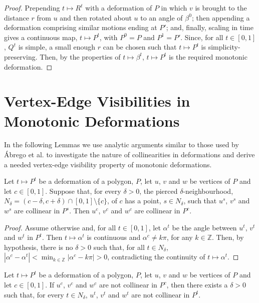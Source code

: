 \documentclass{patmorin}
\newcommand{\Z}[0]{\mathds{Z}}
\begin{document}
\begin{proof}
  Prepending $t\mapsto R^t$ with a deformation of $P$ in which $v$ is
  brought to the distance $r$ from $u$ and then rotated about $u$ to
  an angle of $\beta^0$; then appending a deformation comprising
  similar motions ending at $P'$; and, finally, scaling in time gives
  a continuous map, $t\mapsto P^t$, with $P^0 = P$ and $P^1 = P'$.
  Since, for all $t\in[0,1]$, $Q^t$ is simple, a small enough $r$ can
  be chosen such that $t\mapsto P^t$ is simplicity-preserving.  Then,
  by the properties of $t\mapsto \beta^t$, $t\mapsto P^t$ is the
  required monotonic deformation.
\end{proof}


\iffullversion

\section{Vertex-Edge Visibilities in Monotonic Deformations}

In the following Lemmas we use analytic arguments similar to those
used by {\'A}brego et al. \cite{Abrego11} to investigate the nature of
collinearities in deformations and derive a needed vertex-edge
visibility property of monotonic deformations.

\begin{lemma}
  Let $t\mapsto P^t$ be a deformation of a polygon, $P$, let $u$, $v$
  and $w$ be vertices of $P$ and let $c\in[0,1]$.  Suppose that, for
  every $\delta>0$, the pierced $\delta$-neighbourhood, $N_\delta =
  (c-\delta, c+\delta)\cap [0,1]\setminus \{c\}$, of $c$ has a point,
  $s\in N_\delta$, such that $u^s$, $v^s$ and $w^s$ are collinear in
  $P^s$.  Then $u^c$, $v^c$ and $w^c$ are collinear in $P^c$.
\end{lemma}
\begin{proof}
  Assume otherwise and, for all $t\in[0,1]$, let $\alpha^t$ be the
  angle between $u^t$, $v^t$ and $w^t$ in $P^t$.  Then $t\mapsto
  \alpha^t$ is continuous and $\alpha^c\neq k\pi$, for any $k\in\Z$.
  Then, by hypothesis, there is no $\delta>0$ such that, for all $t\in
  N_\delta$, $|\alpha^c - \alpha^t| < \min_{k\in\Z}|\alpha^c-k\pi| >
  0$, contradicting the continuity of $t\mapsto \alpha^t$.
\end{proof}

\begin{cor}
  Let $t\mapsto P^t$ be a deformation of a polygon, $P$, let $u$, $v$
  and $w$ be vertices of $P$ and let $c\in[0,1]$.  If $u^c$, $v^c$ and
  $w^c$ are not collinear in $P^c$, then there exists a $\delta>0$
  such that, for every $t\in N_\delta$, $u^t$, $v^t$ and $w^t$ are not
  collinear in $P^t$.
\end{cor}
\end{document}
